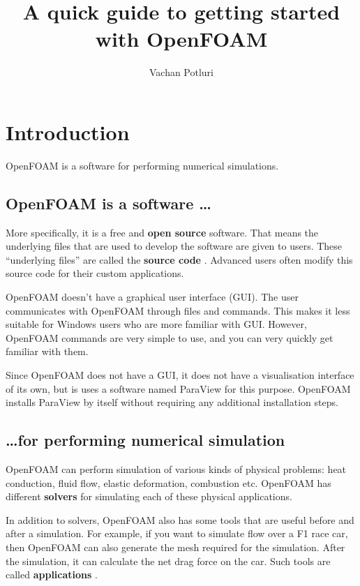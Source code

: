 \documentclass[10pt,a5paper]{article}
\newcommand{\keyword}[1]{%
    \textcolor{keywordcolor}{\bfseries #1}
    \marginnote{\parbox[1]{\marginparwidth}{\raggedright\footnotesize\bfseries\textcolor{keywordcolor}{#1}}}
}
\newcommand{\openfoam}{\software{OpenFOAM}}
\newcommand{\paraview}{\software{ParaView}}
\newcommand{\software}[1]{\textsf{#1}}
\begin{document}

\title{A quick guide to getting started with \openfoam}
\author{Vachan Potluri}
\maketitle

\tableofcontents

\section{Introduction}
\label{sec:intro}
\openfoam{} is a software for performing numerical simulations.

\subsection{\openfoam{} is a software \ldots}
\label{sec:intro_subsec:software}
More specifically, it is a free and \keyword{open source} software. That means the underlying files that are used to develop the software are given to users. These \enquote{underlying files} are called the \keyword{source code}. Advanced users often modify this source code for their custom applications.

\par \openfoam{} doesn't have a graphical user interface (GUI). The user communicates with \openfoam{} through files and commands. This makes it less suitable for \software{Windows} users who are more familiar with GUI. However, \openfoam{} commands are very simple to use, and you can very quickly get familiar with them.

\par Since \openfoam{} does not have a GUI, it does not have a visualisation interface of its own, but is uses a software named \paraview{} for this purpose. \openfoam{} installs \paraview{} by itself without requiring any additional installation steps.

\subsection{\ldots for performing numerical simulation}
\label{sec:intro_subsec:simulation}
\openfoam{} can perform simulation of various kinds of physical problems: heat conduction, fluid flow, elastic deformation, combustion etc. \openfoam{} has different \keyword{solvers} for simulating each of these physical applications.

\par In addition to solvers, \openfoam{} also has some tools that are useful before and after a simulation. For example, if you want to simulate flow over a F1 race car, then \openfoam{} can also generate the mesh required for the simulation. After the simulation, it can calculate the net drag force on the car. Such tools are called \keyword{applications}.
\end{document}
